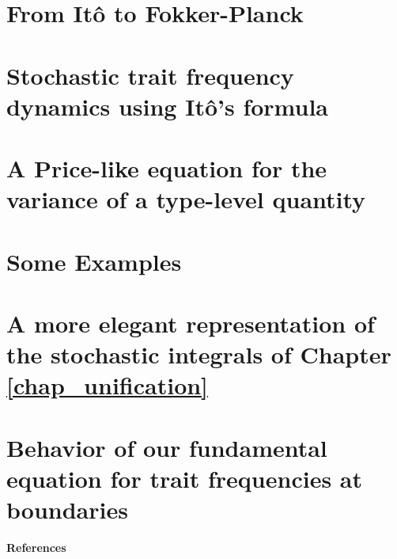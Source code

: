 \documentclass[twoside,12pt]{iiser-thesis-modified} %
\begin{document}
\cleardoublepage
{}
\appendix
{}

\renewcommand{\chaptername}{Appendix}

\fancyhead[CO]{  \rule[-4ex]{0pt}{4ex}\footnotesize\itshape{\chaptername~\thechapter: \nouppercase{\leftmark}}}


\chapter{From It\^{o} to Fokker-Planck}\label{App_SDE_FPE}

\chapter{Stochastic trait frequency dynamics using It\^{o}'s formula}\label{App_density_to_freq}

\chapter{A Price-like equation for the variance of a type-level quantity}\label{App_stoch_var_eqns}

\chapter{Some Examples}\label{App_examples}

\color{blue}
\chapter{A more elegant representation of the stochastic integrals of Chapter \ref{chap_unification}}\label{App_alternative_representation}

\chapter{Behavior of our fundamental equation for trait frequencies at boundaries}\label{App_well_behaved}

\color{black}


\cleardoublepage
{}
\cleardoublepage
{}
\vspace*{1.3cm}
{\noindent\fontsize{48}{60}\selectfont \textbf{References}}
\renewcommand*{\bibfont}{\footnotesize}	
\begingroup
\RaggedRight
\vspace{5ex}
\printbibliography[heading=none]
\endgroup
\end{document}
